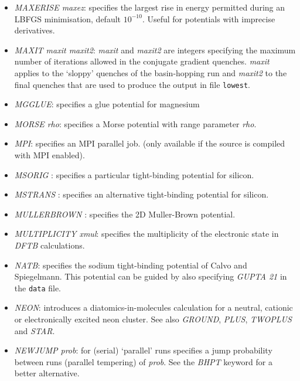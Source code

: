 \documentclass[12pt,a4paper,dvips]{article}
\begin{document}
\begin{itemize}
\item {\it MAXERISE maxez\/}: specifies the largest rise in energy permitted during an LBFGS 
minimisation, default $10^{-10}$. Useful for potentials with imprecise derivatives. 

\item {\it MAXIT maxit maxit2\/}: {\it maxit\/} and {\it maxit2\/} are integers specifying the
maximum number of iterations allowed in the conjugate gradient quenches. {\it maxit\/} applies
to the `sloppy' quenches of the basin-hopping run and {\it maxit2\/} to the final quenches
that are used to produce the output in file {\tt lowest}.

\item {\it MGGLUE\/}: specifies a glue potential for magnesium

\item {\it MORSE rho\/}: specifies a Morse potential 
with range parameter {\it rho\/}.\cite{braierbw90,doyewb95,doyew96a}

\item {\it MPI\/}: specifies an MPI parallel job.
(only available if the source is compiled with MPI enabled).  

\item {\it MSORIG \/}: specifies a particular tight-binding potential for silicon.

\item {\it MSTRANS \/}: specifies an alternative tight-binding potential for silicon.

\item {\it MULLERBROWN \/}: specifies the 2D Muller-Brown potential.

\item {\it MULTIPLICITY xmul\/}: specifies the multiplicity of the electronic state in {\it DFTB\/}
calculations.

\item {\it NATB}: specifies the sodium tight-binding potential of Calvo and Spiegelmann.
This potential can be guided by also specifying {\it GUPTA 21} in the {\tt data} file.

\item {\it NEON\/}: introduces a diatomics-in-molecules calculation for
a neutral, cationic or electronically excited neon cluster. See also
{\it GROUND\/}, {\it PLUS\/}, {\it TWOPLUS\/} and {\it STAR\/}.

\item {\it NEWJUMP prob\/}: for (serial)
`parallel' runs specifies a jump probability between runs 
(parallel tempering) of {\it prob\/}.
See the {\it BHPT\/} keyword for a better alternative.


\end{itemize}
\end{document}
